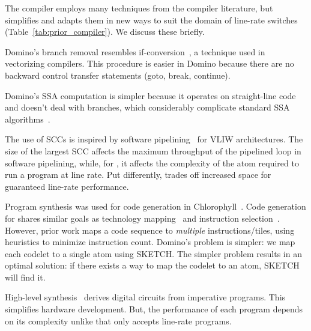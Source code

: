 The \pktlanguage compiler employs many techniques from the compiler literature,
but simplifies and adapts them in new ways to suit the domain of line-rate
switches (Table~\ref{tab:prior_compiler}). We discuss these briefly.
\begin{CompactEnumerate}
  \item Domino's branch removal resembles if-conversion~\cite{if_conversion}, a
    technique used in vectorizing compilers. This procedure is easier in Domino
    because there are no backward control transfer statements (goto, break,
    continue).
  \item Domino's SSA computation is simpler because it operates on
    straight-line code and doesn't deal with branches, which considerably
    complicate standard SSA algorithms~\cite{ssa}.
  \item The use of SCCs is inspired by software
    pipelining~\cite{software_pipelining} for VLIW architectures. The size of
    the largest SCC affects the maximum throughput of the pipelined loop in
    software pipelining, while, for \pktlanguage, it affects the complexity of
    the atom required to run a program at line rate. Put differently, \pktlanguage
    trades off increased space for guaranteed line-rate performance.
  \item Program synthesis was used for code generation in
    Chlorophyll~\cite{chlorophyll}.  Code generation for \pktlanguage shares
    similar goals as technology mapping~\cite{micheli, flowmap, spectransform}
    and instruction selection~\cite{muchnik}.  However, prior work maps a code
    sequence to \textit{multiple} instructions/tiles, using heuristics to
    minimize instruction count. Domino's problem is simpler: we map each
    codelet to a single atom using SKETCH.  The simpler problem results in an
    optimal solution: if there exists a way to map the codelet to an atom,
    SKETCH will find it.
  \item High-level synthesis~\cite{nurvadathi, cash, bluespec, vivado} derives
    digital circuits from imperative programs. This simplifies hardware
    development. But, the performance of each program depends on its complexity
    unlike \pktlanguage that only accepts line-rate programs.
\end{CompactEnumerate}
